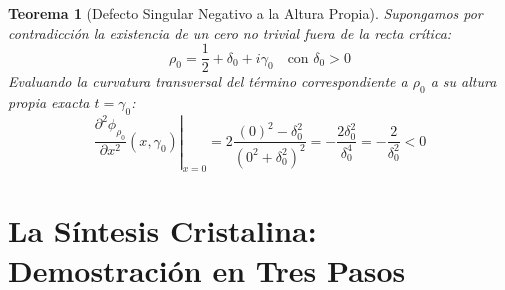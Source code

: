 \documentclass[11pt,a4paper]{article}
\newtheorem{teorema}{Teorema}[section]
\begin{document}
\begin{teorema}[Defecto Singular Negativo a la Altura Propia]
Supongamos por contradicción la existencia de un cero no trivial fuera de la recta crítica:
\begin{equation}
    \rho_0 = \frac{1}{2} + \delta_0 + i\gamma_0 \quad \text{con } \delta_0 > 0
\end{equation}
Evaluando la curvatura transversal del término correspondiente a $\rho_0$ a su altura propia exacta $t = \gamma_0$:
\begin{equation}
    \left. \frac{\partial^2 \phi_{\rho_0}}{\partial x^2}(x, \gamma_0) \right|_{x=0} = 2 \frac{(0)^2 - \delta_0^2}{\left(0^2 + \delta_0^2\right)^2} = -\frac{2\delta_0^2}{\delta_0^4} = -\frac{2}{\delta_0^2} < 0
\end{equation}
\end{teorema}

\section{La Síntesis Cristalina: Demostración en Tres Pasos}
\end{document}

